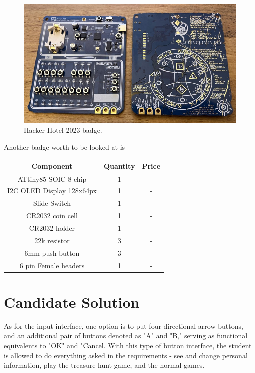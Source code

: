 \documentclass[english]{ist-thesis}
\begin{document}
\begin{figure}[ht]
	\centering
	\includegraphics[width = 0.8\linewidth]{images/hacker_hotel.jpg}
	\caption{Hacker Hotel 2023 badge.}
	\label{fig:hacker_hotel}
\end{figure}

Another badge worth to be looked at is 

\begin{center}
\begin{tabular}{ |c|c|c| } 
 \hline
 Component & Quantity & Price \\ 
 \hline
 ATtiny85 SOIC-8 chip & 1 & - \\ 
 \hline
 I2C OLED Display 128x64px & 1 & - \\ 
 \hline
 Slide Switch & 1 & - \\ 
 \hline
 CR2032 coin cell & 1 & - \\ 
 \hline
 CR2032 holder & 1 & - \\ 
 \hline
 22k resistor & 3 & - \\ 
 \hline
 6mm push button & 3 & - \\ 
 \hline
 6 pin Female headers & 1 & - \\ 
 \hline
\end{tabular}
\end{center}

\section{Candidate Solution}

As for the input interface, one option is to put four directional arrow buttons, and an additional pair of buttons denoted as "A" and "B," serving as functional equivalents to "OK" and "Cancel. With this type of button interface, the student is allowed to do everything asked in the requirements - see and change personal information, play the treasure hunt game, and the normal games. 
\end{document}
